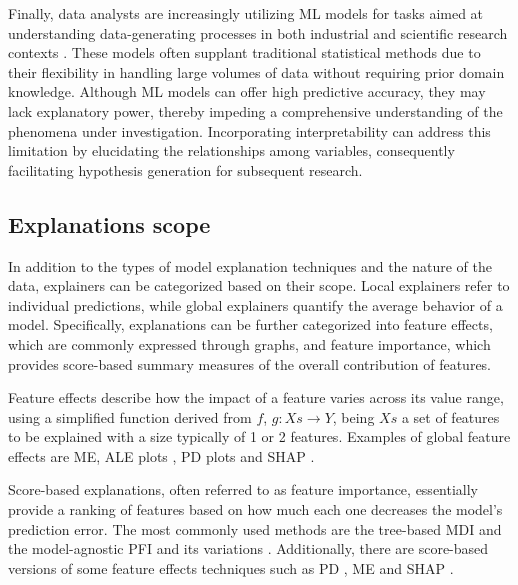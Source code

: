 Finally, data analysts are increasingly utilizing \gls{ML} models for tasks aimed at understanding data-generating processes in both industrial and scientific research contexts \cite{Freiesleben2022ScientificPhenomena, SilvaFilho2023AAchievement}. These models often supplant traditional statistical methods due to their flexibility in handling large volumes of data without requiring prior domain knowledge. Although ML models can offer high predictive accuracy, they may lack explanatory power, thereby impeding a comprehensive understanding of the phenomena under investigation. Incorporating interpretability can address this limitation by elucidating the relationships among variables, consequently facilitating hypothesis generation for subsequent research.

\subsection{Explanations scope}

In addition to the types of model explanation techniques and the nature of the data, explainers can be categorized based on their scope. Local explainers refer to individual predictions, while global explainers quantify the average behavior of a model. Specifically, explanations can be further categorized into feature effects, which are commonly expressed through graphs, and feature importance, which provides score-based summary measures of the overall contribution of features.

Feature effects describe how the impact of a feature varies across its value range, using a simplified function derived from \(f\), $ g: Xs \xrightarrow{} Y$, being $Xs$ a set of features to be explained with a size typically of 1 or 2 features. Examples of global feature effects are \gls{ME}\cite{Long2021UsingOutcomes, Mize2019AModels}, \gls{ALE} plots \cite{Apley2020VisualizingModels}, \gls{PD} plots \cite{Friedman2001GreedyMachine.} and \gls{SHAP} \cite{10.5555/3295222.3295230}. 

Score-based explanations, often referred to as feature importance, essentially provide a ranking of features based on how much each one decreases the model's prediction error. The most commonly used methods are the tree-based \gls{MDI} \cite{Breiman2001RandomForests} and the model-agnostic \gls{PFI}\cite{Fisher2018AllSimultaneously} and its variations \cite{Molnar2023Model-agnosticApproach, Strobl2008ConditionalForests}. Additionally, there are score-based versions of some feature effects techniques such as \gls{PD} \cite{Greenwell2018AMeasure}, \gls{ME} \cite{long1997regression} and \gls{SHAP} \cite{Lee2023SHAPForecasting}.

